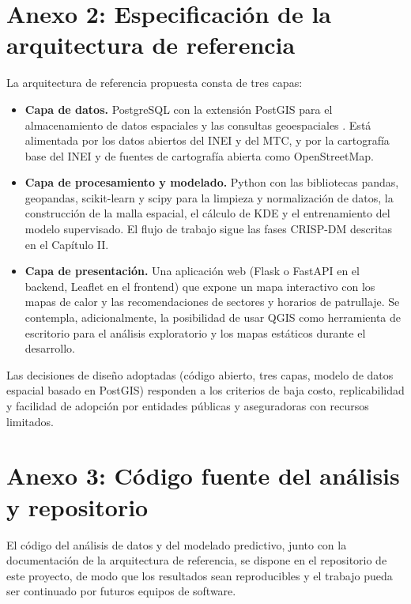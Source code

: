 \section*{Anexo 2: Especificaci\'on de la arquitectura de referencia}

La arquitectura de referencia propuesta consta de tres capas:

\begin{itemize}
    \item \textbf{Capa de datos.} PostgreSQL con la extensi\'on PostGIS para el almacenamiento de datos espaciales y las consultas geoespaciales \citep{postgis2024}. Est\'a alimentada por los datos abiertos del INEI y del MTC, y por la cartograf\'ia base del INEI y de fuentes de cartograf\'ia abierta como OpenStreetMap.
    \item \textbf{Capa de procesamiento y modelado.} Python con las bibliotecas pandas, geopandas, scikit-learn y scipy para la limpieza y normalizaci\'on de datos, la construcci\'on de la malla espacial, el c\'alculo de KDE y el entrenamiento del modelo supervisado. El flujo de trabajo sigue las fases CRISP-DM descritas en el Cap\'itulo II.
    \item \textbf{Capa de presentaci\'on.} Una aplicaci\'on web (Flask o FastAPI en el backend, Leaflet en el frontend) que expone un mapa interactivo con los mapas de calor y las recomendaciones de sectores y horarios de patrullaje. Se contempla, adicionalmente, la posibilidad de usar QGIS \citep{qgis2024} como herramienta de escritorio para el an\'alisis exploratorio y los mapas est\'aticos durante el desarrollo.
\end{itemize}

Las decisiones de dise\~no adoptadas (c\'odigo abierto, tres capas, modelo de datos espacial basado en PostGIS) responden a los criterios de baja costo, replicabilidad y facilidad de adopci\'on por entidades p\'ublicas y aseguradoras con recursos limitados.

\section*{Anexo 3: C\'odigo fuente del an\'alisis y repositorio}

El c\'odigo del an\'alisis de datos y del modelado predictivo, junto con la documentaci\'on de la arquitectura de referencia, se dispone en el repositorio de este proyecto, de modo que los resultados sean reproducibles y el trabajo pueda ser continuado por futuros equipos de software.
